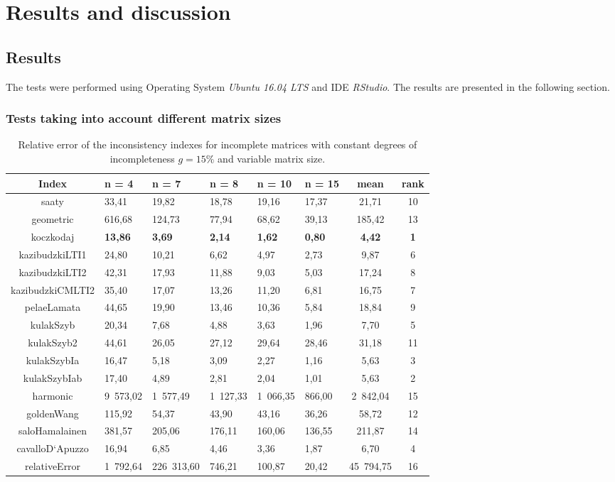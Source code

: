 \chapter{Results and discussion}
\label{sec:results}
\section{Results}
The tests were performed using Operating System \textit{Ubuntu 16.04 LTS} and IDE \textit{RStudio}. The results are presented in the following section.

\subsection{Tests taking into account different matrix sizes}
\begin{table}[h]
\begin{center}
\caption{Relative error of the inconsistency indexes for incomplete matrices with constant degrees of incompleteness $g=15\%$ and variable matrix size.}
\label{tab:results1}
\begin{tabular}{|c||l|l|l|l|l|c||c|}
\hline Index & n = 4 & n = 7 & n = 8 & n = 10 & n = 15 & mean & rank \\ \hline \hline
saaty & 33,41 & 19,82 & 18,78 & 19,16 & 17,37 & 21,71 & 10 \\ \hline
geometric & 616,68 & 124,73 & 77,94 & 68,62 & 39,13 & 185,42 & 13 \\ \hline
koczkodaj & \textbf{13,86} & \textbf{3,69} & \textbf{2,14} & \textbf{1,62} & \textbf{0,80} & \textbf{4,42} & \textbf{1} \\ \hline
kazibudzkiLTI1 & 24,80 & 10,21 & 6,62 & 4,97 & 2,73 & 9,87 & 6 \\ \hline
kazibudzkiLTI2 & 42,31 & 17,93 & 11,88 & 9,03 & 5,03 & 17,24 & 8 \\ \hline
kazibudzkiCMLTI2 & 35,40 & 17,07 & 13,26 & 11,20 & 6,81 & 16,75 & 7 \\ \hline
pelaeLamata & 44,65 & 19,90 & 13,46 & 10,36 & 5,84 & 18,84 & 9 \\ \hline
kulakSzyb & 20,34 & 7,68 & 4,88 & 3,63 & 1,96 & 7,70 & 5 \\ \hline
kulakSzyb2 & 44,61 & 26,05 & 27,12 & 29,64 & 28,46 & 31,18 & 11 \\ \hline
kulakSzybIa & 16,47 & 5,18 & 3,09 & 2,27 & 1,16 & 5,63 & 3 \\ \hline
kulakSzybIab & 17,40 & 4,89 & 2,81 & 2,04 & 1,01 & 5,63 & 2 \\ \hline
harmonic & 9 573,02 & 1 577,49 & 1 127,33 & 1 066,35 & 866,00 & 2 842,04 & 15 \\ \hline
goldenWang & 115,92 & 54,37 & 43,90 & 43,16 & 36,26 & 58,72 & 12 \\ \hline
saloHamalainen & 381,57 & 205,06 & 176,11 & 160,06 & 136,55 & 211,87 & 14 \\ \hline
cavalloD`Apuzzo & 16,94 & 6,85 & 4,46 & 3,36 & 1,87 & 6,70 & 4 \\ \hline
relativeError & 1 792,64 & 226 313,60 & 746,21 & 100,87 & 20,42 & 45 794,75 & 16 \\ \hline
\end{tabular}
\end{center}
\end{table}

